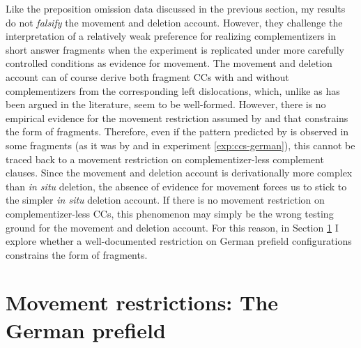 Like the preposition omission data discussed in the previous section, my results do not \textit{falsify} the movement and deletion account. However, they challenge the interpretation of a relatively weak preference for realizing complementizers in short answer fragments when the experiment is replicated under more carefully controlled conditions as evidence for movement. The movement and deletion account can of course derive both fragment CCs with and without complementizers from the corresponding left dislocations, which, unlike as has been argued in the literature, seem to be well-formed. However, there is no empirical evidence for the movement restriction assumed by \citet{merchant2004} and \citet{merchant.etal2013} that constrains the form of fragments. Therefore, even if the pattern predicted by \citet{merchant2004} is observed in some fragments (as it was by \citet{merchant.etal2013} and in experiment \ref{exp:ccs-german}), this cannot be traced back to a movement restriction on complementizer-less complement clauses. Since the movement and deletion account is derivationally more complex than \textit{in situ} deletion, the absence of evidence for movement forces us to stick to the simpler \textit{in situ} deletion account. If there is no movement restriction on complementizer-less CCs, this phenomenon may simply be the wrong testing ground for the movement and deletion account. For this reason, in Section \ref{sec:mvb} I explore whether a well-documented restriction on German prefield configurations constrains the form of fragments.

\newpage
\section{Movement restrictions: The German prefield}\label{sec:mvb}
